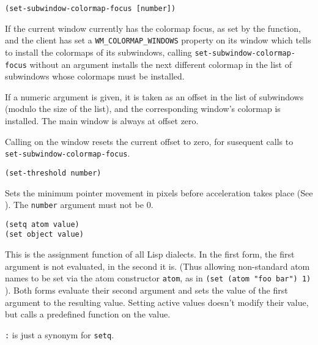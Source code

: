 
{\usagefont\begin{verbatim}
(set-subwindow-colormap-focus [number])
\end{verbatim}}\usageupspace

If the current window currently has the colormap focus, as set
by the  function, and the client has set a
\verb"WM_COLORMAP_WINDOWS" property on its window which tells 
{\GWM} to install
the colormaps of its subwindows, calling \verb"set-subwindow-colormap-focus"
without an argument installs the next different colormap in the list of
subwindows whose colormaps must be installed.

If a numeric argument is given, it is taken as an offset in the list of
subwindows (modulo the size of the list), and the corresponding window's
colormap is installed. The main window is always at offset zero.

Calling  on the window resets the current offset
to zero, for susequent calls to \verb"set-subwindow-colormap-focus".


        
{\usagefont\begin{verbatim}
(set-threshold number)
\end{verbatim}}\usageupspace

Sets the minimum pointer movement in pixels before acceleration takes place
(See ). The \verb"number" argument must not be 0.

        
{\usagefont\begin{verbatim}
(setq atom value)
(set object value)
\end{verbatim}}\usageupspace

This is the assignment function of all Lisp dialects. In the first form,
the first argument is not evaluated, in the second it is.
(Thus allowing non-standard atom names to be set via the atom constructor
\verb"atom", as in \verb|(set (atom "foo bar") 1)| ). Both forms evaluate 
their second
argument and sets the value of the first argument to the resulting
value. Setting active values
doesn't modify their value, but calls a predefined function on the value.

\verb":" is just a synonym for \verb"setq".

